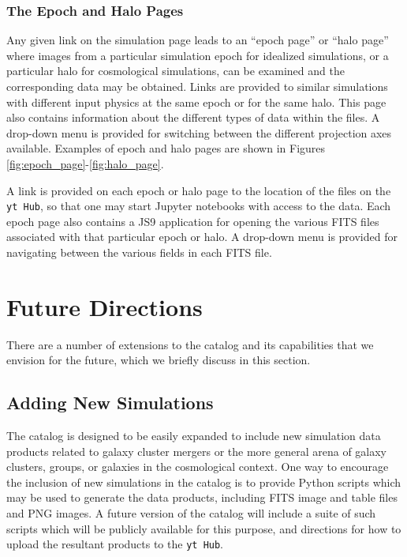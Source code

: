 \documentclass{emulateapj}
\newcommand{\code}[1]{\texttt{#1}}
\begin{document}
\subsubsection{The Epoch and Halo Pages}\label{sec:epoch_page}

Any given link on the simulation page leads to an ``epoch page'' or ``halo page'' where images from a particular simulation epoch for idealized simulations, or a particular halo for cosmological simulations, can be examined and the corresponding data may be obtained. Links are provided to similar simulations with different input physics at the same epoch or for the same halo. This page also contains information about the different types of data within the files. A drop-down menu is provided for switching between the different projection axes available. Examples of epoch and halo pages are shown in Figures \ref{fig:epoch_page}-\ref{fig:halo_page}.

A link is provided on each epoch or halo page to the location of the files on the \code{yt Hub}, so that one may start Jupyter notebooks with access to the data. Each epoch page also contains a JS9 application for opening the various FITS files associated with that particular epoch or halo. A drop-down menu is provided for navigating between the various fields in each FITS file. 

\section{Future Directions}\label{sec:future}

There are a number of extensions to the catalog and its capabilities that we envision for the future, which we briefly discuss in this section.

\subsection{Adding New Simulations}\label{sec:new_sims}

The catalog is designed to be easily expanded to include new simulation data products related to galaxy cluster mergers or the more general arena of galaxy clusters, groups, or galaxies in the cosmological context. One way to encourage the inclusion of new simulations in the catalog is to provide Python scripts which may be used to generate the data products, including FITS image and table files and PNG images. A future version of the catalog will include a suite of such scripts which will be publicly available for this purpose, and directions for how to upload the resultant products to the \code{yt Hub}.
\end{document}
